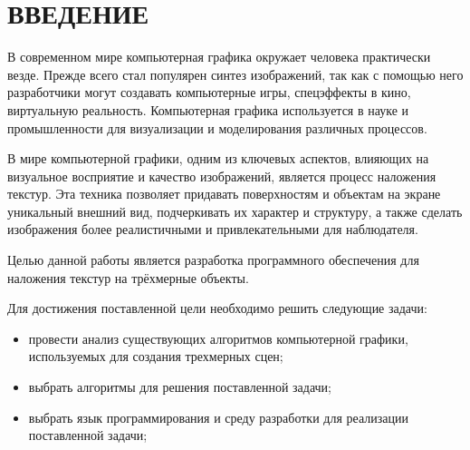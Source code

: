 \section*{\centering ВВЕДЕНИЕ}

В современном мире компьютерная графика окружает человека практически везде.
Прежде всего стал популярен синтез изображений, так как с помощью него разработчики могут создавать компьютерные игры, спецэффекты в кино, виртуальную реальность. Компьютерная графика используется в науке и промышленности для визуализации и
моделирования различных процессов.

В мире компьютерной графики, одним из ключевых аспектов, влияющих на визуальное восприятие и качество изображений, является процесс наложения текстур.
Эта техника позволяет придавать поверхностям и объектам на экране уникальный внешний вид, подчеркивать их характер и структуру, а также сделать изображения более реалистичными и привлекательными для наблюдателя.

Целью данной работы является разработка программного обеспечения для наложения текстур на трёхмерные объекты.

Для достижения поставленной цели необходимо решить следующие задачи:
\begin{itemize}
	\item провести анализ существующих алгоритмов компьютерной графики, используемых для создания трехмерных сцен;
	\item выбрать алгоритмы для решения поставленной задачи;
	\item выбрать язык программирования и среду разработки для реализации поставленной задачи;
\end{itemize}